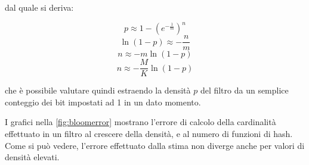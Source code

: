 dal quale si deriva:

$$ p \approx 1-(e^{-\frac{1}{m}})^n $$
$$ \ln(1-p) \approx -\frac{n}{m} $$
$$ n \approx -m\ln(1-p) $$
\begin{equation} \label{eq:bloomcard}
n \approx -\frac{M}{K}\ln(1-p)
\end{equation}

che è possibile valutare quindi estraendo la densità $p$ del filtro da un semplice conteggio
dei bit impostati ad 1 in un dato momento.

I grafici nella \autoref{fig:bloomerror} mostrano l'errore di calcolo della cardinalità
effettuato in un filtro al crescere della densità, e al numero di funzioni di hash. Come si può
vedere, l'errore effettuato dalla stima non diverge anche per valori di densità elevati.

\begin{figure}
	\centering
	\begin{minipage}[c]{0.7\textwidth}
	\end{minipage}
	\begin{minipage}[c]{0.7\textwidth}
\end{minipage}
\end{figure}
